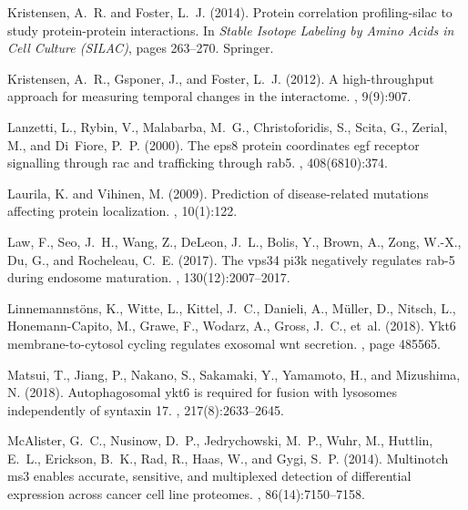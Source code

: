 \documentclass[12pt,english]{article}
\begin{document}
\begin{thebibliography}{}
Kristensen, A.~R. and Foster, L.~J. (2014).
\newblock Protein correlation profiling-silac to study protein-protein
  interactions.
\newblock In {\em Stable Isotope Labeling by Amino Acids in Cell Culture
  (SILAC)}, pages 263--270. Springer.

Kristensen, A.~R., Gsponer, J., and Foster, L.~J. (2012).
\newblock A high-throughput approach for measuring temporal changes in the
  interactome.
, 9(9):907.

Lanzetti, L., Rybin, V., Malabarba, M.~G., Christoforidis, S., Scita, G.,
  Zerial, M., and Di~Fiore, P.~P. (2000).
\newblock The eps8 protein coordinates egf receptor signalling through rac and
  trafficking through rab5.
, 408(6810):374.

Laurila, K. and Vihinen, M. (2009).
\newblock Prediction of disease-related mutations affecting protein
  localization.
, 10(1):122.

Law, F., Seo, J.~H., Wang, Z., DeLeon, J.~L., Bolis, Y., Brown, A., Zong,
  W.-X., Du, G., and Rocheleau, C.~E. (2017).
\newblock The vps34 pi3k negatively regulates rab-5 during endosome maturation.
, 130(12):2007--2017.

Linnemannst{\"o}ns, K., Witte, L., Kittel, J.~C., Danieli, A., M{\"u}ller, D.,
  Nitsch, L., Honemann-Capito, M., Grawe, F., Wodarz, A., Gross, J.~C., et~al.
  (2018).
\newblock Ykt6 membrane-to-cytosol cycling regulates exosomal wnt secretion.
, page 485565.

Matsui, T., Jiang, P., Nakano, S., Sakamaki, Y., Yamamoto, H., and Mizushima,
  N. (2018).
\newblock Autophagosomal ykt6 is required for fusion with lysosomes
  independently of syntaxin 17.
, 217(8):2633--2645.

McAlister, G.~C., Nusinow, D.~P., Jedrychowski, M.~P., Wuhr, M., Huttlin,
  E.~L., Erickson, B.~K., Rad, R., Haas, W., and Gygi, S.~P. (2014).
\newblock Multinotch ms3 enables accurate, sensitive, and multiplexed detection
  of differential expression across cancer cell line proteomes.
, 86(14):7150--7158.


\end{thebibliography}
\end{document}

